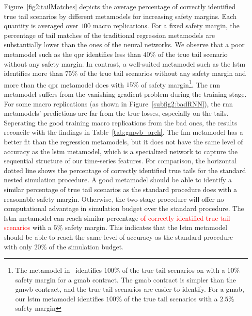 Figure~\ref{fig2:tailMatches} depicts the average percentage of correctly identified true tail scenarios by different metamodels for increasing safety margins.
Each quantity is averaged over $100$ macro replications.
For a fixed safety margin, the percentage of tail matches of the traditional regression metamodels are substantially lower than the ones of the neural networks.
We observe that a poor metamodel such as the \gls{qpr} identifies less than $40\%$ of the true tail scenario without any safety margin.
In contrast, a well-suited metamodel such as the \gls{lstm} identifies more than $75\%$ of the true tail scenarios without any safety margin and more than the \gls{qpr} metamodel does with $15\%$ of safety margin\footnote{The metamodel in~\cite{dang2020efficient} identifies $100\%$ of the true tail scenarios on with a $10\%$ safety margin for a \gls{gmab} contract.
The \gls{gmab} contract is simpler than the \gls{gmwb} contract, and the true tail scenarios are easier to identify. 
For a \gls{gmab}, our \gls{lstm} metamodel identifies $100\%$ of the true tail scenarios with a $2.5\%$ safety margin}.
The \gls{rnn} metamodel suffers from the vanishing gradient problem during the training stage. 
For some macro replications (as shown in Figure~\ref{subfig2:badRNN}), the \gls{rnn} metamodels' predictions are far from the true losses, especially on the tails.
Seperating the good training macro replications from the bad ones, the results reconcile with the findings in Table~\ref{tab:gmwb_arch}.
The \gls{fnn} metamodel has a better fit than the regression metamodels, but it does not have the same level of accuracy as the \gls{lstm} metamodel, which is a specialized network to capture the sequential structure of our time-series features.
For comparison, the horizontal dotted line shows the percentage of correctly identified true tails for the standard nested simulation procedure.
A good metamodel should be able to identify a similar percentage of true tail scenarios as the standard procedure does with a reasonable safety margin.
Otherwise, the two-stage procedure will offer no computational advantage in simulation budget over the standard procedure.
The \gls{lstm} metamodel can reach similar percentage \textcolor{red}{of correctly identified true tail scenarios} with a $5\%$ safety margin.
This indicates that the \gls{lstm} metamodel should be able to reach the same level of accuracy as the standard procedure with only $20\%$ of the simulation budget.

